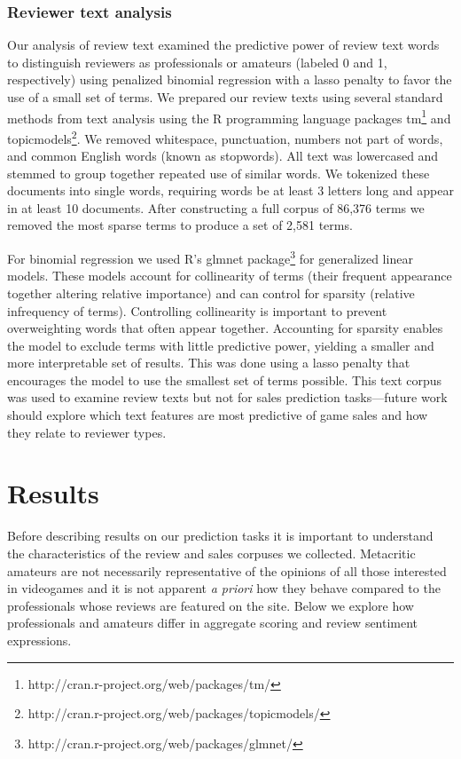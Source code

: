\documentclass[letterpaper]{article}
\begin{document}
\subsubsection{Reviewer text analysis}
Our analysis of review text examined the predictive power of review text words to distinguish reviewers as professionals or amateurs (labeled 0 and 1, respectively) using penalized binomial regression with a lasso penalty to favor the use of a small set of terms. 
We prepared our review texts using several standard methods from text analysis using the R programming language packages tm\footnote{http://cran.r-project.org/web/packages/tm/} and topicmodels\footnote{http://cran.r-project.org/web/packages/topicmodels/}. We removed whitespace, punctuation, numbers not part of words, and common English words (known as stopwords). All text was lowercased and stemmed to group together repeated use of similar words. We tokenized these documents into single words, requiring words be at least 3 letters long and appear in at least 10 documents. After constructing a full corpus of 86,376 terms we removed the most sparse terms to produce a set of 2,581 terms.

For binomial regression we used R's glmnet package\footnote{http://cran.r-project.org/web/packages/glmnet/} for generalized linear models. These models account for collinearity of terms (their frequent appearance together altering relative importance) and can control for sparsity (relative infrequency of terms). Controlling collinearity is important to prevent overweighting words that often appear together. Accounting for sparsity enables the model to exclude terms with little predictive power, yielding a smaller and more interpretable set of results. This was done using a lasso penalty that encourages the model to use the smallest set of terms possible. This text corpus was used to examine review texts but not for sales prediction tasks---future work should explore which text features are most predictive of game sales and how they relate to reviewer types.


\section{Results}
Before describing results on our prediction tasks it is important to understand the characteristics of the review and sales corpuses we collected. Metacritic amateurs are not necessarily representative of the opinions of all those interested in videogames and it is not apparent \textit{a priori} how they behave compared to the professionals whose reviews are featured on the site. Below we explore how professionals and amateurs differ in aggregate scoring and review sentiment expressions.
\end{document}
